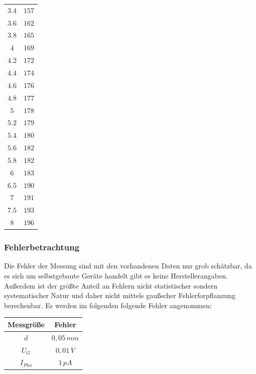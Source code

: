 \begin{center}
\begin{longtable}{c|c}
\(3.4\) & \( 157 \) \\ 
\(3.6\) & \( 162 \) \\ 
\(3.8\) & \( 165 \) \\ 
\(4\) & \( 169 \) \\ 
\(4.2\) & \( 172 \) \\ 
\(4.4\) & \( 174 \) \\ 
\(4.6\) & \( 176 \) \\ 
\(4.8\) & \( 177 \) \\ 
\(5\) & \( 178 \) \\ 
\(5.2\) & \( 179 \) \\ 
\(5.4\) & \( 180 \) \\ 
\(5.6\) & \( 182 \) \\ 
\(5.8\) & \( 182 \) \\ 
\(6\) & \( 183 \) \\ 
\(6.5\) & \( 190\) \\ 
\(7\) & \( 191 \) \\ 
\(7.5\) & \( 193\) \\ 
\(8\) & \( 196 \) \\
\end{longtable}
\end{center}
\subsubsection{Fehlerbetrachtung}
Die Fehler der Messung sind mit den vorhandenen Daten nur grob schätzbar, da es sich um selbstgebaute Geräte handelt gibt es keine Herstellerangaben. Außerdem ist der größte Anteil an Fehlern nicht statistischer sondern systematischer Natur und daher nicht mittels gaußscher Fehlerforpflanzung berechenbar. Es werden im folgenden folgende Fehler angenommen:
\begin{center}
\begin{tabular}{c|c}
Messgröße & Fehler \\\hline
\(d\) & \( 0,05\,mm\)\\
\(U_G\) & \( 0,01\,V\)\\
\(I_{Pho}\) & \( 1\, pA\)\\
\end{tabular}
\end{center}
